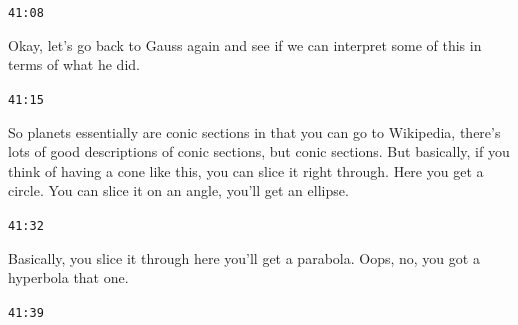 \documentclass[11pt,a4paper]{article}
\newcommand{\timestamp}[1]{%
  \par\vspace{0.35em}%
  \noindent\colorbox{timestampback}{\textcolor{timestampblue}{\small\texttt{#1}}}%
  \par\vspace{0.2em}%
}
\begin{document}
\timestamp{41:08}

Okay, let's go back to Gauss again and see if we can interpret some of this in terms of what he did.



\timestamp{41:15}

So planets essentially are conic sections in that you can go to Wikipedia, there's lots of good descriptions of conic sections, but conic sections. But basically, if you think of having a cone like this, you can slice it right through. Here you get a circle. You can slice it on an angle, you'll get an ellipse.



\timestamp{41:32}

Basically, you slice it through here you'll get a parabola. Oops, no, you got a hyperbola that one.



\timestamp{41:39}
\end{document}
